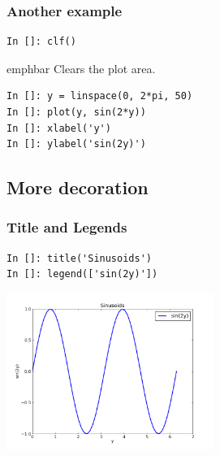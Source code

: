 \documentclass[14pt,compress]{beamer}
\newcommand{\emphbar}[1]
{\begin{beamercolorbox}[rounded=true]{emphbar} 
      {#1}
 \end{beamercolorbox}
}
\begin{document}
\begin{frame}[fragile]
\frametitle{Another example}
  \begin{lstlisting}
In []: clf()
  \end{lstlisting}
\emphbar{Clears the plot area.}
  \begin{lstlisting}
In []: y = linspace(0, 2*pi, 50)
In []: plot(y, sin(2*y))
In []: xlabel('y')
In []: ylabel('sin(2y)')
  \end{lstlisting}
\end{frame}

\subsection{More decoration}
\begin{frame}[fragile]
\frametitle{Title and Legends}
\vspace*{-0.15in}
\begin{lstlisting}
In []: title('Sinusoids')
In []: legend(['sin(2y)'])
\end{lstlisting}
  \vspace*{-0.1in}
  \begin{center}
  \includegraphics[height=2in, interpolate=true]{data/legend}  
  \end{center}
\end{frame}
\end{document}
